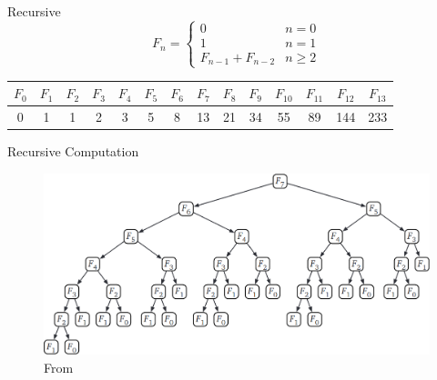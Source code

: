 \documentclass[aspectratio=169]{beamer}
\begin{document}
\begin{frame}{Recursive}
    \[
        F_n = \begin{cases}
                0                       & n = 0 \\
                1                       & n = 1 \\
                F_{n - 1} + F_{n - 2}   & n \geq 2
              \end{cases}
    \]
    
    \pause
    \vspace{20pt}
    \begin{table}[]
        \begin{tabular}{|c|c|c|c|c|c|c|c|c|c|c|c|c|c|}
            \hline
            $F_0$ & $F_1$ & $F_2$ & $F_3$ & $F_4$ & $F_5$ & $F_6$ & $F_7$ & $F_8$ & $F_9$ & $F_{10}$ & $F_{11}$ & $F_{12}$ & $F_{13}$ \\ \hline
            0     & 1     & 1     & 2     & 3     & 5     & 8     & 13    & 21    & 34    & 55       & 89       & 144      & 233      \\ \hline
        \end{tabular}
    \end{table}
\end{frame}

\begin{frame}{Recursive Computation}
    \begin{figure}
        \centering
        \includegraphics[scale=0.4]{images/F7_Recursion.png}
        \caption{From \cite{book:algorithms}}
    \end{figure}
\end{frame}
\end{document}
